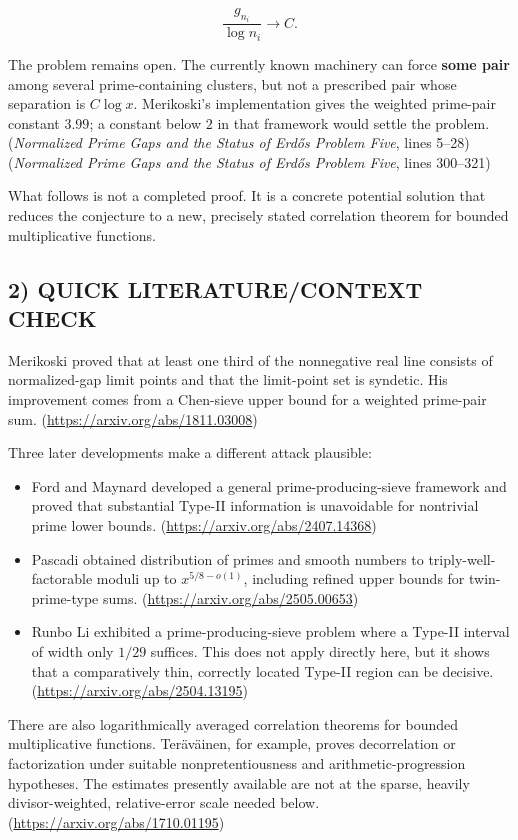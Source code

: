 \[
\frac{g_{n_i}}{\log n_i}\longrightarrow C.
\]

The problem remains open. The currently known machinery can force \textbf{some pair} among several prime-containing clusters, but not a prescribed pair whose separation is \(C\log x\). Merikoski’s implementation gives the weighted prime-pair constant \(3.99\); a constant below \(2\) in that framework would settle the problem. (\textit{Normalized Prime Gaps and the Status of Erd\H{o}s Problem Five}, lines 5--28) (\textit{Normalized Prime Gaps and the Status of Erd\H{o}s Problem Five}, lines 300--321)

What follows is not a completed proof. It is a concrete potential solution that reduces the conjecture to a new, precisely stated correlation theorem for bounded multiplicative functions.

\subsection*{2) QUICK LITERATURE/CONTEXT CHECK}

Merikoski proved that at least one third of the nonnegative real line consists of normalized-gap limit points and that the limit-point set is syndetic. His improvement comes from a Chen-sieve upper bound for a weighted prime-pair sum. (\url{https://arxiv.org/abs/1811.03008})

Three later developments make a different attack plausible:

\begin{itemize}
\item Ford and Maynard developed a general prime-producing-sieve framework and proved that substantial Type-II information is unavoidable for nontrivial prime lower bounds. (\url{https://arxiv.org/abs/2407.14368})
\item Pascadi obtained distribution of primes and smooth numbers to triply-well-factorable moduli up to \(x^{5/8-o(1)}\), including refined upper bounds for twin-prime-type sums. (\url{https://arxiv.org/abs/2505.00653})
\item Runbo Li exhibited a prime-producing-sieve problem where a Type-II interval of width only \(1/29\) suffices. This does not apply directly here, but it shows that a comparatively thin, correctly located Type-II region can be decisive. (\url{https://arxiv.org/abs/2504.13195})
\end{itemize}

There are also logarithmically averaged correlation theorems for bounded multiplicative functions. Teräväinen, for example, proves decorrelation or factorization under suitable nonpretentiousness and arithmetic-progression hypotheses. The estimates presently available are not at the sparse, heavily divisor-weighted, relative-error scale needed below. (\url{https://arxiv.org/abs/1710.01195})

